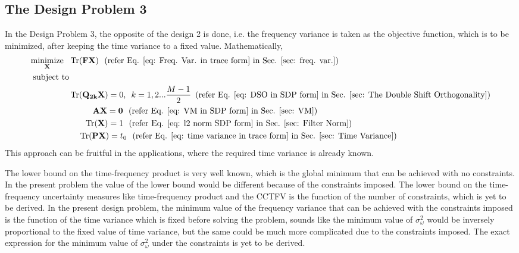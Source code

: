 \subsection{The Design Problem 3}
\label{sub: The Design Problem 3}
In the Design Problem $3$, the opposite of the design 2 is done, i.e. the frequency variance is taken as the objective function, which is to be minimized, after keeping the time variance to a fixed value. Mathematically,
\begin{eqnarray}
\begin{aligned}
\underset{\mathbf{X}} {\text{minimize}}\,\,\,\, & \operatorname{Tr}(\mathbf{FX})\,\,\,\,  (\text{refer Eq. \ref{eq: Freq. Var. in trace form} in Sec. \ref{sec: freq. var.}})
\\ \text{subject to} &\\
& \operatorname{Tr}(\mathbf{Q_{2k}X}) = {0}, \,\,\, k=1,2...\frac{M-1}{2} \,\,\,(\text{refer Eq. \ref{eq: DSO in SDP form} in Sec. \ref{sec: The Double Shift Orthogonality}})
\\&\,\,\,\,\,\,\,\,\,\,\,\,\,\,\,\,\, \mathbf{AX} = \mathbf{0} \,\,\,\, (\text{refer Eq. \ref{eq: VM in SDP form} in Sec. \ref{sec: VM}}) 
\\&\,\,\,\,\,\,\,\,\,\,\, \operatorname{Tr}(\mathbf{X}) = {1} \,\,\,\, (\text{refer Eq. \ref{eq: l2 norm SDP form} in Sec. \ref{sec: Filter Norm}})
\\ &\,\,\,\,\,\,\, \operatorname{Tr}(\mathbf{PX}) = t_0 \,\,\,\, (\text{refer Eq. \ref{eq: time variance in trace form} in Sec. \ref{sec: Time Variance}})
\end{aligned}
\end{eqnarray}
This approach can be fruitful in the applications, where the required time variance is already known. 

The lower bound on the time-frequency product is very well known, which is the global minimum that can be achieved with no constraints. In the present problem the value of the lower bound would be different because of the constraints imposed. The lower bound on the time-frequency uncertainty measures like time-frequency product and the CCTFV is the function of the number of constraints, which is yet to be derived. In the present design problem, the minimum value of the frequency variance that can be achieved with the constraints imposed is the function of the time variance which is fixed before solving the problem, sounds like the minimum value of $\sigma_\omega^2$ would be inversely proportional to the fixed value of time variance, but the same could be much more complicated due to the constraints imposed. The exact expression for the minimum value of $\sigma_\omega^2$ under the constraints is yet to be derived.

